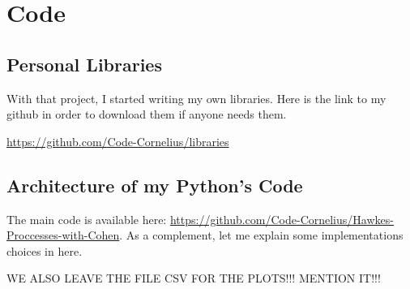 \chapter{Code}

\section{Personal Libraries}
\label{personal_lib}
With that project, I started writing my own libraries. Here is the link to my github in order to download them if anyone needs them. 

\href{https://github.com/Code-Cornelius/libraries}{https://github.com/Code-Cornelius/libraries}


\section{Architecture of my Python's Code}
The main code is available here: 
\href{https://github.com/Code-Cornelius/Hawkes-Proccesses-with-Cohen}{https://github.com/Code-Cornelius/Hawkes-Proccesses-with-Cohen}. As a complement, let me explain some implementations choices in here.



WE ALSO LEAVE THE FILE CSV FOR THE PLOTS!!! MENTION IT!!!